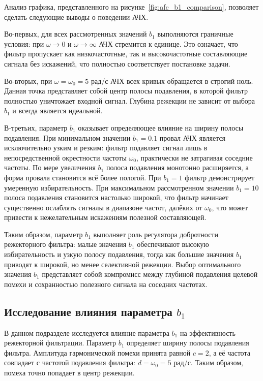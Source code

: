 Анализ графика, представленного на рисунке~\ref{fig:afc_b1_comparison}, позволяет сделать следующие выводы о поведении АЧХ.

Во-первых, для всех рассмотренных значений $b_1$ выполняются граничные условия: при $\omega \to 0$ и $\omega \to \infty$ АЧХ стремится к единице. Это означает, что фильтр пропускает как низкочастотные, так и высокочастотные составляющие сигнала без искажений, что полностью соответствует постановке задачи.

Во-вторых, при $\omega = \omega_0 = 5$ рад/с АЧХ всех кривых обращается в строгий ноль. Данная точка представляет собой центр полосы подавления, в которой фильтр полностью уничтожает входной сигнал. Глубина режекции не зависит от выбора $b_1$ и всегда является идеальной.

В-третьих, параметр $b_1$ оказывает определяющее влияние на ширину полосы подавления. При минимальном значении $b_1 = 0.1$ провал АЧХ является исключительно узким и резким: фильтр подавляет сигнал лишь в непосредственной окрестности частоты $\omega_0$, практически не затрагивая соседние частоты. По мере увеличения $b_1$ полоса подавления монотонно расширяется, а форма провала становится всё более пологой. При $b_1 = 1$ фильтр демонстрирует умеренную избирательность. При максимальном рассмотренном значении $b_1 = 10$ полоса подавления становится настолько широкой, что фильтр начинает существенно ослаблять сигналы в диапазоне частот, далёких от $\omega_0$, что может привести к нежелательным искажениям полезной составляющей.

Таким образом, параметр $b_1$ выполняет роль регулятора добротности режекторного фильтра: малые значения $b_1$ обеспечивают высокую избирательность и узкую полосу подавления, тогда как большие значения $b_1$ приводят к широкой, но менее селективной режекции. Выбор оптимального значения $b_1$ представляет собой компромисс между глубиной подавления целевой помехи и сохранностью полезного сигнала на соседних частотах.


\subsection{Исследование влияния параметра $b_1$}

В данном подразделе исследуется влияние параметра $b_1$ на эффективность режекторной фильтрации. Параметр $b_1$ определяет ширину полосы подавления фильтра. Амплитуда гармонической помехи принята равной $c = 2$, а её частота совпадает с частотой подавления фильтра: $d = \omega_0 = 5$ рад/с. Таким образом, помеха точно попадает в центр режекции.

